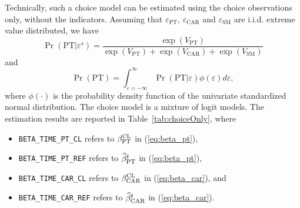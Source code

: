 \documentclass[12pt,a4paper]{article}
\newcommand{\req}[1]{(\ref{#1})}
\newcommand{\prob}{\operatorname{Pr}}
\begin{document}
Technically, such a choice model can be estimated using the choice observations
only, without the indicators. Assuming that $\varepsilon_{\text{PT}}$,
$\varepsilon_{\text{CAR}}$ and $\varepsilon_{\text{SM}}$ are
i.i.d. extreme value distributed, we have
\begin{equation}
\prob(\text{PT}|\varepsilon^s) = \frac{\exp(V_\text{PT})}{\exp(V_\text{PT})+\exp(V_\text{CAR})+\exp(V_\text{SM})} 
\end{equation}
and
\begin{equation}
\prob(\text{PT}) =
\int_{\varepsilon=-\infty}^{\infty}\prob(\text{PT}|\varepsilon)\phi(\varepsilon) d\varepsilon,
\end{equation}
where $\phi(\cdot)$ is the probability density function of
the univariate standardized normal
distribution.
The choice model is a mixture of logit models. The estimation results
are reported in Table~\ref{tab:choiceOnly}, where 
\begin{itemize}
\item \lstinline$BETA_TIME_PT_CL$ refers to $\beta^\protect\text{CL}_\protect\text{PT}$ in \req{eq:beta_pt},
\item \lstinline$BETA_TIME_PT_REF$ refers to $\widehat{\beta}^t_\protect\text{PT}$ in \req{eq:beta_pt},
\item \lstinline$BETA_TIME_CAR_CL$ refers to
  $\beta^\protect\text{CL}_\protect\text{CAR}$ in \req{eq:beta_car}, and
\item \lstinline$BETA_TIME_CAR_REF$ refers to $\widehat{\beta}^t_\protect\text{CAR}$ in \req{eq:beta_car}.
\end{itemize}
\end{document}
